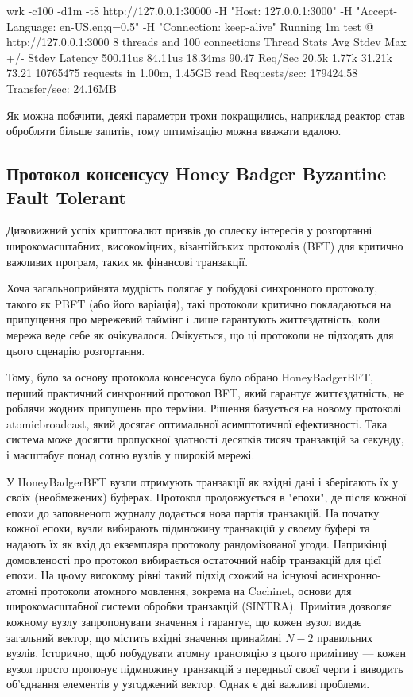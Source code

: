 \documentclass{lib/styles/default-style}
\begin{document}
    \begin{snippet}
        wrk -c100 -d1m -t8 http://127.0.0.1:30000 -H "Host: 127.0.0.1:3000" -H "Accept-Language: en-US,en;q=0.5" -H "Connection: keep-alive"
        Running 1m test @ http://127.0.0.1:3000
        8 threads and 100 connections
        Thread Stats   Avg      Stdev     Max   +/- Stdev
            Latency   500.11us   84.11us  18.34ms   90.47%
            Req/Sec    20.5k     1.77k   31.21k    73.21%
        10765475 requests in 1.00m, 1.45GB read
        Requests/sec:  179424.58
        Transfer/sec:     24.16MB
    \end{snippet}

    Як можна побачити, деякі параметри трохи покращились, наприклад реактор став обробляти більше запитів, тому оптимізацію можна вважати вдалою.

\subsection{Протокол консенсусу Honey Badger Byzantine Fault Tolerant}

    Дивовижний успіх криптовалют призвів до сплеску інтересів у розгортанні широкомасштабних,
    високоміцних, візантійських протоколів (BFT) для критично важливих програм,
    таких як фінансові транзакції.
    
    Хоча загальноприйнята мудрість полягає у побудові синхронного протоколу, такого як PBFT (або його варіація),
    такі протоколи критично покладаються на припущення про мережевий таймінг і лише гарантують життєздатність,
    коли мережа веде себе як очікувалося. Очікується, що ці протоколи не підходять для цього сценарію розгортання.
    
    Тому, було за основу протокола консенсуса було обрано HoneyBadgerBFT,
    перший практичний синхронний протокол BFT, який гарантує життєздатність,
    не роблячи жодних припущень про терміни. Рішення базується на новому протоколі atomicbroadcast,
    який досягає оптимальної асимптотичної ефективності. Така система може досягти пропускної здатності десятків тисяч транзакцій за секунду,
    і масштабує понад сотню вузлів у широкій мережі.

    У HoneyBadgerBFT вузли отримують транзакції як вхідні дані і зберігають їх у своїх
    (необмежених) буферах.
    Протокол продовжується в "епохи", де після кожної епохи до заповненого журналу додається нова партія транзакцій.
    На початку кожної епохи, вузли вибирають підмножину транзакцій у своєму буфері
    та надають їх як вхід до екземпляра протоколу рандомізованої угоди.
    Наприкінці домовленості про протокол вибирається остаточний набір транзакцій для цієї епохи.
    На цьому високому рівні такий підхід схожий на існуючі асинхронно-атомні протоколи атомного мовлення,
    зокрема на Cachinet, основи для широкомасштабної системи обробки транзакцій (SINTRA).
    Примітив дозволяє кожному вузлу запропонувати значення і гарантує, що кожен вузол видає загальний вектор,
    що містить вхідні значення принаймні $N-2$ правильних вузлів.
    Історично, щоб побудувати атомну трансляцію з цього примітиву --- кожен вузол просто пропонує підмножину транзакцій
    з передньої своєї черги і виводить об'єднання елементів у узгоджений вектор. Однак є дві важливі проблеми.
\end{document}
